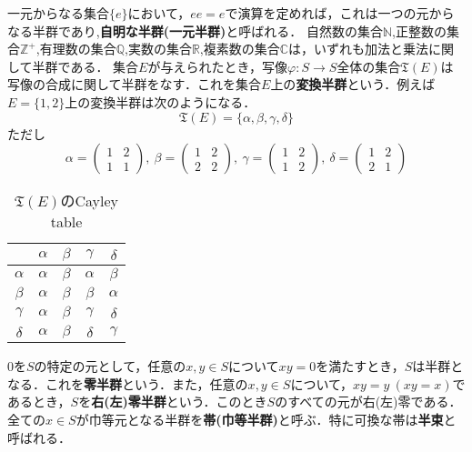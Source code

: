 \newline
{}
一元からなる集合$\{e\}$において，$ee=e$で演算を定めれば，これは一つの元からなる半群であり,{\bf 自明な半群(一元半群)}と呼ばれる．
自然数の集合$\mathbb N$,正整数の集合$\mathbb Z^+$,有理数の集合$\mathbb Q$,実数の集合$\mathbb R$,複素数の集合$\mathbb C$は，いずれも加法と乗法に関して半群である．
集合$E$が与えられたとき，写像$\varphi:S\rightarrow S$全体の集合${\mathfrak T}(E)$は写像の合成に関して半群をなす．これを集合$E$上の{\bf 変換半群}という．例えば$E=\{1,2\}$上の変換半群は次のようになる．$${\mathfrak T}(E)=\{\alpha, \beta,\gamma,\delta\}$$
ただし
$$
\alpha=
\begin{pmatrix}
1&2 \\
1&1
\end{pmatrix}
,\:\beta=
\begin{pmatrix}
1&2 \\
2&2
\end{pmatrix}
,\:\gamma=
\begin{pmatrix}
1&2 \\
1&2
\end{pmatrix}
,\:\delta=
\begin{pmatrix}
1&2 \\
2&1
\end{pmatrix}
$$
\begin{table}[htb]
\begin{center}
\begin{tabular}{c|cccc}
 &$\alpha$&$\beta$&$\gamma$&$\delta$ \\ \hline
$\alpha$&$\alpha$&$\beta$&$\alpha$&$\beta$ \\
$\beta$&$\alpha$&$\beta$&$\beta$&$\alpha$ \\
$\gamma$&$\alpha$&$\beta$&$\gamma$&$\delta$ \\
$\delta$&$\alpha$&$\beta$&$\delta$&$\gamma$  
\end{tabular}
\caption{${\mathfrak T}(E)$のCayley table}
\end{center}
\end{table}
$0$を$S$の特定の元として，任意の$x,y\in S$について$xy=0$を満たすとき，$S$は半群となる．これを{\bf 零半群}という．また，任意の$x,y\in S$について，$xy=y\:(xy=x)$であるとき，$S$を{\bf 右(左)零半群}という．このとき$S$のすべての元が右(左)零である．
全ての$x\in S$が巾等元となる半群を{\bf 帯(巾等半群)}と呼ぶ．特に可換な帯は{\bf 半束}と呼ばれる．
